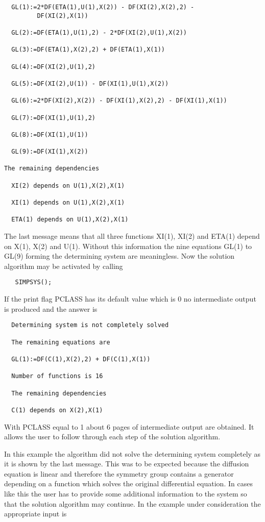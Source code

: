 \begin{verbatim}
  GL(1):=2*DF(ETA(1),U(1),X(2)) - DF(XI(2),X(2),2) - 
         DF(XI(2),X(1))

  GL(2):=DF(ETA(1),U(1),2) - 2*DF(XI(2),U(1),X(2))

  GL(3):=DF(ETA(1),X(2),2) + DF(ETA(1),X(1))

  GL(4):=DF(XI(2),U(1),2)

  GL(5):=DF(XI(2),U(1)) - DF(XI(1),U(1),X(2))

  GL(6):=2*DF(XI(2),X(2)) - DF(XI(1),X(2),2) - DF(XI(1),X(1))

  GL(7):=DF(XI(1),U(1),2)

  GL(8):=DF(XI(1),U(1))

  GL(9):=DF(XI(1),X(2))

The remaining dependencies

  XI(2) depends on U(1),X(2),X(1)

  XI(1) depends on U(1),X(2),X(1)

  ETA(1) depends on U(1),X(2),X(1)
\end{verbatim}

The last message means that all three functions XI(1), XI(2) and
ETA(1) depend on X(1), X(2) and U(1). Without this information the
nine equations GL(1) to GL(9) forming the determining system are
meaningless. Now the solution algorithm may be activated by calling

\begin{verbatim}
   SIMPSYS();
\end{verbatim}

If the print flag PCLASS has its default value which is 0 no
intermediate output is produced and the answer is

\begin{verbatim}
  Determining system is not completely solved

  The remaining equations are

  GL(1):=DF(C(1),X(2),2) + DF(C(1),X(1))

  Number of functions is 16

  The remaining dependencies

  C(1) depends on X(2),X(1)
\end{verbatim}

With PCLASS equal to 1 about 6 pages of intermediate output are
obtained. It allows the user to follow through each step of the
solution algorithm.

In this example the algorithm did not solve the determining system
completely as it is shown by the last message. This was to be expected
because the diffusion equation is linear and therefore the symmetry
group contains a generator depending on a function which solves the
original differential equation. In cases like this the user has to
provide some additional information to the system so that the solution
algorithm may continue. In the example under consideration the
appropriate input is

